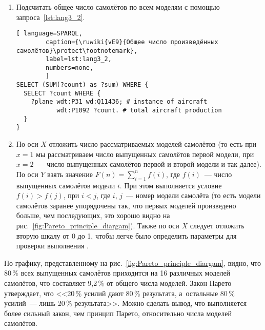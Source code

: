 
\begin{enumerate} 
  \item Подсчитать общее число самолётов по всем моделям с помощью запроса~\ref{lst:lang3_2}.
  
\begin{lstlisting}[ language=SPARQL, 
        caption={\ruwiki{vE9}{Общее число произведённых самолётов}\protect\footnotemark}, 
        label=lst:lang3_2, 
        numbers=none, 
        ]
SELECT (SUM(?count) as ?sum) WHERE {
  SELECT ?count WHERE {
    ?plane wdt:P31 wd:Q11436; # instance of aircraft
		   wdt:P1092 ?count. # total aircraft production
  }
}
\end{lstlisting}
  
  
  \item По оси $X$ отложить число рассматриваемых моделей самолётов 
      (то есть при $x = 1$ мы рассматриваем число выпущенных самолётов первой модели, 
        при $x = 2$~--- число выпущенных самолётов первой и второй модели и так далее). 
        По оси $Y$ взять значение $F(n) = \sum\limits_{i=1}^n f(i)$, 
        где $f(i)$~--- число выпущенных самолётов модели $i$. 
        При этом выполняется условие $f(i) > f(j)$, при $i < j$, 
        где $i$, $j$~--- номер модели самолёта 
        (то есть модели самолётов заранее упорядочены так, что 
        первых моделей произведено больше, чем последующих, это хорошо видно на рис.~\ref{fig:Pareto_principle_diargam}). 
        Также по оси $X$ следует отложить вторую шкалу от 0 до 1, 
        чтобы легче было определить параметры для проверки выполнения .
\end{enumerate}

По графику, представленному на рис.~\ref{fig:Pareto_principle_diargam}, видно, 
что 80\,\% всех выпущенных самолётов приходится на 16 различных моделей самолётов, 
что составляет 9,2\,\% от общего числа моделей. 
Закон Парето утверждает, что 
<<20\,\% усилий дают 80\,\% результата, а~остальные 80\,\% усилий~--- лишь 20\,\% результата>>. 
Можно сделать вывод, что выполняется более сильный закон, чем принцип Парето, относительно числа моделей самолётов.


